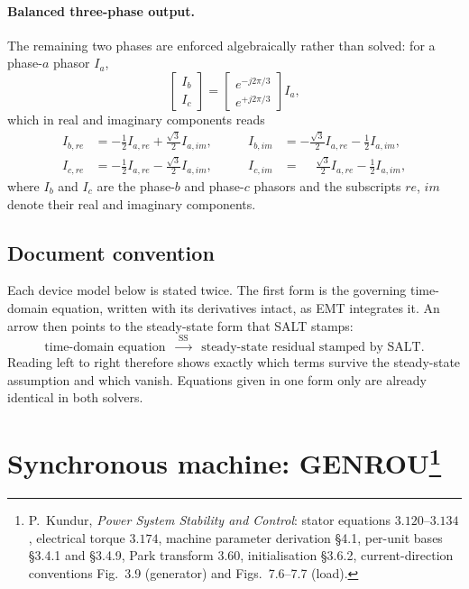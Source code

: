 \documentclass[11pt]{article}
\begin{document}
\paragraph{Balanced three-phase output.}
The remaining two phases are enforced algebraically rather than solved: for
a phase-$a$ phasor $I_a$,
\begin{equation}
  \begin{bmatrix}I_b\\ I_c\end{bmatrix}
  = \begin{bmatrix}e^{-j2\pi/3}\\ e^{+j2\pi/3}\end{bmatrix} I_a ,
  \label{eq:balanced}
\end{equation}
which in real and imaginary components reads
\begin{equation}
  \begin{aligned}
    I_{b,re} &= -\tfrac{1}{2}I_{a,re} + \tfrac{\sqrt{3}}{2}I_{a,im}, &\qquad
    I_{b,im} &= -\tfrac{\sqrt{3}}{2}I_{a,re} - \tfrac{1}{2}I_{a,im},\\
    I_{c,re} &= -\tfrac{1}{2}I_{a,re} - \tfrac{\sqrt{3}}{2}I_{a,im}, &\qquad
    I_{c,im} &= \phantom{-}\tfrac{\sqrt{3}}{2}I_{a,re} - \tfrac{1}{2}I_{a,im},
  \end{aligned}
\end{equation}
where $I_{b}$ and $I_{c}$ are the phase-$b$ and phase-$c$ phasors and the
subscripts $re$, $im$ denote their real and imaginary components.

\subsection{Document convention}

Each device model below is stated twice. The first form is the governing
time-domain equation, written with its derivatives intact, as EMT
integrates it. An arrow then points to the steady-state form that SALT
stamps:
\begin{equation*}
  \text{time-domain equation}
  \;\;\xrightarrow{\;\text{SS}\;}\;\;
  \text{steady-state residual stamped by SALT}.
\end{equation*}
Reading left to right therefore shows exactly which terms survive the
steady-state assumption and which vanish. Equations given in one form only
are already identical in both solvers.

\section[Synchronous machine: GENROU]{Synchronous machine:
GENROU\protect\footnote{P.~Kundur, \emph{Power System Stability and
Control}: stator equations $3.120$--$3.134$, electrical torque $3.174$,
machine parameter derivation \S4.1, per-unit bases \S3.4.1 and \S3.4.9,
Park transform $3.60$, initialisation \S3.6.2, current-direction
conventions Fig.~3.9 (generator) and Figs.~7.6--7.7 (load).}}
\end{document}
